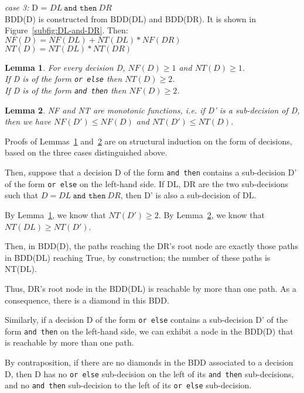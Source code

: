 \documentclass[a4paper,12pt,twoside]{article}
\renewcommand{\le}{\leqslant}
\renewcommand{\ge}{\geqslant}
\newcommand{\andthen}{\texttt{and then}}
\newcommand{\orelse}{\texttt{or else}}
\newtheorem{lemma}{Lemma}[subsection]
\begin{document}
\emph{case 3:} D = $DL \ \andthen{} \ DR$\\
BDD(D) is constructed from BDD(DL) and BDD(DR). It is shown 
in Figure~\ref{subfig:DL-and-DR}. Then:\\
$NF(D) = NF(DL) + NT(DL) * NF(DR)$\\
$NT(D) = NT(DL) * NT(DR)$

\begin{lemma}
\label{lemma:NF-NT-bound}
For every decision D, $NF(D) \ge 1$ and $NT(D) \ge 1$.\\
If D is of the form \orelse{} then $NT(D) \ge 2$.\\
If D is of the form \andthen{} then $NF(D) \ge 2$.
\end{lemma}

\begin{lemma}
\label{lemma:NF-NT-monotonic}
NF and NT are monotonic functions, i.e. if D' is a sub-decision of D,
then we have
        $NF(D') \le NF(D)$
and        
        $NT(D') \le NT(D)$.
\end{lemma}

Proofs of Lemmas~\ref{lemma:NF-NT-bound} and~\ref{lemma:NF-NT-monotonic} are on
structural induction on the form of decisions, based on the three cases
distinguished above.

Then, suppose that a decision D of the form \andthen{} contains a
sub-decision D' of the form \orelse{} on the left-hand side. If DL, DR
are the two sub-decisions such that $D = DL \ \andthen{} \ DR$, then D' is
also a sub-decision of DL.

By Lemma~\ref{lemma:NF-NT-bound}, we know that $NT(D') \ge 2$. By
Lemma~\ref{lemma:NF-NT-monotonic}, we know that $NT(DL) \ge NT(D')$.

Then, in BDD(D), the paths reaching the DR's root node are exactly
those paths in BDD(DL) reaching True, by construction; the number of
these paths is NT(DL).

Thus, DR's root node in the BDD(DL) is reachable by more than one
path. As a consequence, there is a diamond in this BDD.

Similarly, if a decision D of the form \orelse{} contains a
sub-decision D' of the form \andthen{} on the left-hand side, we can
exhibit a node in the BDD(D) that is reachable by more
than one path.

By contraposition, if there are no diamonds in the BDD associated to a
decision D, then D has no \orelse{} sub-decision on the left of its
\andthen{} sub-decisions, and no \andthen{} sub-decision to the left of
its \orelse{} sub-decision.
\end{document}
